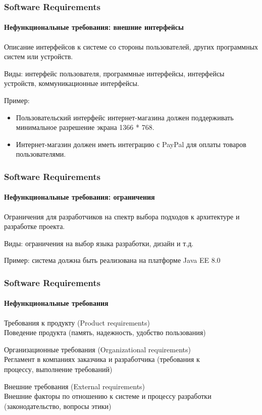 \documentclass[aspectratio=169, 12pt]{beamer}
\begin{document}
\begin{frame}
    \frametitle{Software Requirements}
    \framesubtitle{Нефункциональные требования: внешние интерфейсы}
    Описание интерфейсов к системе со стороны пользователей, других
    программных систем или устройств. \newline \pause

    Виды: интерфейс пользователя, программные интерфейсы, интерфейсы устройств,
    коммуникационные интерфейсы. \newline \pause

    Пример:
    \begin{itemize}
        \item Пользовательский интерфейс интернет-магазина должен поддерживать
              минимальное разрешение экрана 1366 * 768.
        \item Интернет-магазин должен иметь интеграцию с PayPal для оплаты товаров
              пользователями.
    \end{itemize}
\end{frame}

\begin{frame}
    \frametitle{Software Requirements}
    \framesubtitle{Нефункциональные требования: ограничения}
    Ограничения для разработчиков на спектр выбора подходов к архитектуре
    и разработке проекта. \newline \pause

    Виды: ограничения на выбор языка разработки, дизайн и т.д. \newline \pause

    Пример: система должна быть реализована на платформе Java EE 8.0
\end{frame}

\begin{frame}
    \frametitle{Software Requirements}
    \framesubtitle{Нефункциональные требования}
    Требования к продукту (Product requirements) \\
    \hspace{0.5cm} Поведение продукта (память, надежность, удобство пользования) \newline \pause

    Организационные требования (Organizational requirements) \\
    \hspace{0.5cm} Регламент в компаниях заказчика и разработчика (требования к \\
    \hspace{0.5cm} процессу, выполнение требований) \newline \pause

    Внешние требования (External requirements) \\
    \hspace{0.5cm} Внешние факторы по отношению к системе и процессу разработки \\
    \hspace{0.5cm} (законодательство, вопросы этики)
\end{frame}
\end{document}
